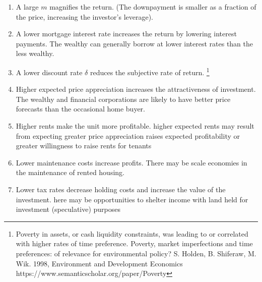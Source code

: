\begin{enumerate}
\item A large $m$ magnifies the return. (The downpayment is smaller as a fraction of the price, increasing the investor's leverage). 

\item A lower mortgage interest rate increases the return by lowering interest payments.  The wealthy can generally borrow  at lower interest rates than the less wealthy. 

\item A lower discount rate $\delta$ reduces the subjective rate of return.  \footnote{Poverty in assets, or cash liquidity constraints, was leading to or correlated with higher rates of time preference. Poverty, market imperfections and time preferences: of relevance for environmental policy?   S. Holden, B. Shiferaw, M. Wik.  1998, Environment and Development Economics https://www.semanticscholar.org/paper/Poverty %
}
\item Higher expected price appreciation increases the attractiveness of investment. The wealthy and financial corporations  are likely to have better price forecasts than  the occasional home buyer.
\item Higher rents make the unit more profitable. higher expected  rents may result from expecting greater price appreciation raises expected profitability or greater willingness to raise rents for tenants 

\item Lower maintenance costs increase profits. There may be scale economies in the maintenance  of rented housing. 
\item Lower tax rates decrease holding costs and increase the value of the investment. here may be opportunities to shelter income with land held for investment (speculative) purposes
\end{enumerate}

